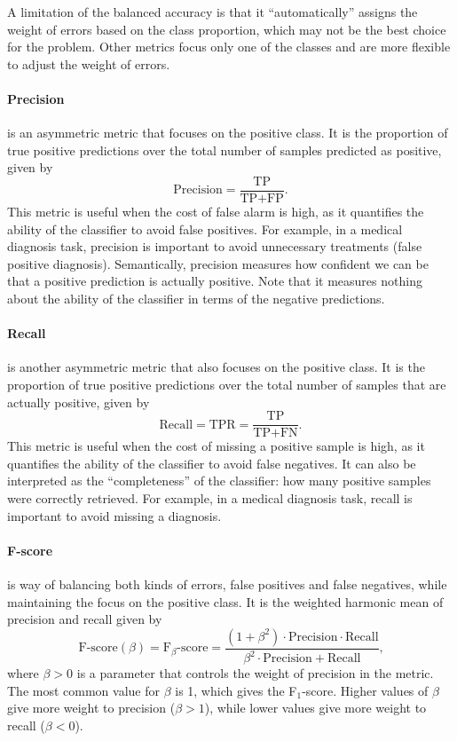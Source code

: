 A limitation of the balanced accuracy is that it ``automatically'' assigns the weight of
errors based on the class proportion, which may not be the best choice for the problem.
Other metrics focus only one of the classes and are more flexible to adjust the weight of
errors.

\paragraph{Precision} is an asymmetric metric that focuses on the positive class.  It is
the proportion of true positive predictions over the total number of samples predicted as
positive, given by
\begin{equation*}
  \text{Precision} = \frac{\text{TP}}{\text{TP} + \text{FP}}\text{.}
\end{equation*}
This metric is useful when the cost of false alarm is high, as it quantifies the
ability of the classifier to avoid false positives.  For example, in a medical diagnosis
task, precision is important to avoid unnecessary treatments (false positive diagnosis).
Semantically, precision measures how confident we can be that a positive prediction is
actually positive.  Note that it measures nothing about the ability of the classifier in
terms of the negative predictions.

\paragraph{Recall} is another asymmetric metric that also focuses on the positive class.
It is the proportion of true positive predictions over the total number of
samples that are actually positive, given by
\begin{equation*}
  \text{Recall} = \text{TPR} = \frac{\text{TP}}{\text{TP} + \text{FN}}\text{.}
\end{equation*}
This metric is useful when the cost of missing a positive sample is high, as it quantifies the
ability of the classifier to avoid false negatives.  It can also be interpreted as the
``completeness'' of the classifier: how many positive samples were correctly retrieved.
For example, in a medical diagnosis task, recall is important to avoid missing a
diagnosis.

\paragraph{F-score} is way of balancing both kinds of errors, false positives and false
negatives, while maintaining the focus on the positive class. It is the weighted harmonic
mean of precision and recall given by
\begin{equation*}
  \text{F-score}(\beta) = \text{F}_\beta\text{-score} =
    \frac%
      {(1 + \beta^2) \cdot \text{Precision} \cdot \text{Recall}}
      {\beta^2 \cdot \text{Precision} + \text{Recall}}\text{,}
\end{equation*}
where $\beta > 0$ is a parameter that controls the weight of precision in the metric.
The most common value for $\beta$ is 1, which gives the F$_1$-score.  Higher values of
$\beta$ give more weight to precision ($\beta > 1$), while lower values give more weight
to recall ($\beta < 0$).

